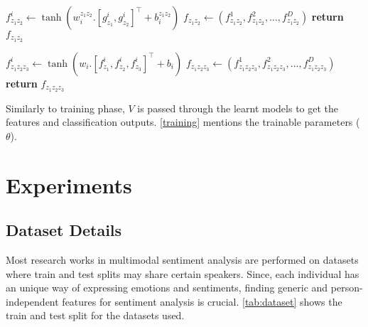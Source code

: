 \documentclass[review]{elsarticle}
\newcommand\?[1]{\hl{#1}}
\begin{document}
\begin{algorithm}[!ht]
\begin{algorithmic}[1]
        \vspace{2mm}
         
        \State $f_{z_1z_2}^i \gets \tanh(w_i^{z_1z_2}.[g^i_{z_1},
        g^i_{z_2}]^\intercal+b_i^{z_1z_2})$
        \EndFor
        \State $f_{z_1z_2} \gets (f_{z_1z_2}^1, f_{z_1z_2}^2,\dots,f_{z_1z_2}^{D})$
        \State \textbf{return} $f_{z_1z_2}$
        \EndProcedure
        
        
        \vspace{2mm}
         
        \State $f^i_{z_1z_2z_3} \gets \tanh(w_i.[f^i_{z_1}, f^i_{z_2}, f^i_{z_3}]^\intercal+b_i)$
        \EndFor
        \State $f_{z_1z_2z_3} \gets (f_{z_1z_2z_3}^1, f_{z_1z_2z_3}^2,\dots,f_{z_1z_2z_3}^{D})$
        \State \textbf{return} $f_{z_1z_2z_3}$
        \EndProcedure
        
        \vspace{2mm}
        \State \footnotesize{Similarly to training phase, $V$ is passed through the learnt models
        to get the features and classification outputs. \cref{training}
        mentions the trainable parameters ($\theta$).}
        \EndProcedure
    \end{algorithmic}
\end{algorithm}

\section{Experiments}
\label{sec:experiments}

\subsection{Dataset Details}
\label{datasets}
Most research works in multimodal sentiment analysis are performed on datasets
where train and test splits may share certain speakers. Since, each individual
has an unique way of expressing emotions and sentiments, finding generic and
person-independent features for sentiment analysis is
crucial. \cref{tab:dataset} shows the train and test split for the datasets
used.
\end{document}

